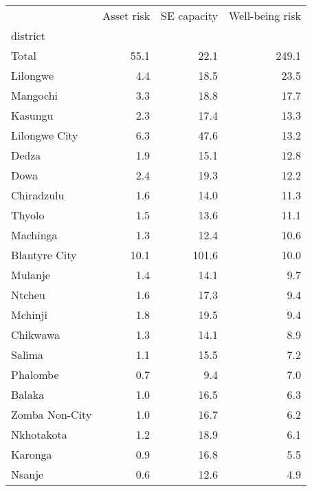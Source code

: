 \begin{tabular}{lrrr}
\toprule
{} &  Asset risk &  SE capacity &  Well-being risk \\
district       &             &              &                  \\
\midrule
Total          &        55.1 &         22.1 &            249.1 \\
Lilongwe       &         4.4 &         18.5 &             23.5 \\
Mangochi       &         3.3 &         18.8 &             17.7 \\
Kasungu        &         2.3 &         17.4 &             13.3 \\
Lilongwe City  &         6.3 &         47.6 &             13.2 \\
Dedza          &         1.9 &         15.1 &             12.8 \\
Dowa           &         2.4 &         19.3 &             12.2 \\
Chiradzulu     &         1.6 &         14.0 &             11.3 \\
Thyolo         &         1.5 &         13.6 &             11.1 \\
Machinga       &         1.3 &         12.4 &             10.6 \\
Blantyre City  &        10.1 &        101.6 &             10.0 \\
Mulanje        &         1.4 &         14.1 &              9.7 \\
Ntcheu         &         1.6 &         17.3 &              9.4 \\
Mchinji        &         1.8 &         19.5 &              9.4 \\
Chikwawa       &         1.3 &         14.1 &              8.9 \\
Salima         &         1.1 &         15.5 &              7.2 \\
Phalombe       &         0.7 &          9.4 &              7.0 \\
Balaka         &         1.0 &         16.5 &              6.3 \\
Zomba Non-City &         1.0 &         16.7 &              6.2 \\
Nkhotakota     &         1.2 &         18.9 &              6.1 \\
Karonga        &         0.9 &         16.8 &              5.5 \\
Nsanje         &         0.6 &         12.6 &              4.9 \\

\end{tabular}
